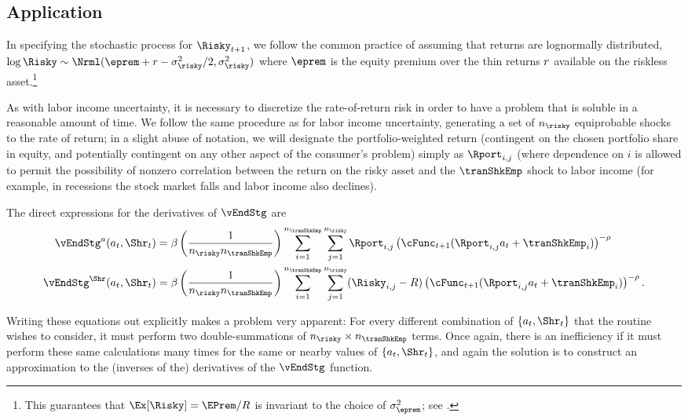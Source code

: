 \subsection{Application}\label{subsec:MCApplication}


In specifying the stochastic process for $\Risky_{\prd+1}$, we follow the common practice of assuming that returns are lognormally distributed, $\log \Risky \sim \Nrml(\eprem+\rfree-\sigma^{2}_{\risky}/2,\sigma^{2}_{\risky})$ where $\eprem$ is the equity premium over the thin returns $r$ available on the riskless asset.\footnote{This guarantees that $\Ex[\Risky] = \EPrem/\Rfree$ is invariant to the choice of $\sigma^{2}_{\eprem}$; see .}

As with labor income uncertainty, it is necessary to discretize the rate-of-return risk in order to have a problem that is soluble in a reasonable amount of time.  We follow the same procedure as for labor income uncertainty, generating a set of $n_{\risky}$ equiprobable shocks to the rate of return; in a slight abuse of notation, we will designate the portfolio-weighted return (contingent on the chosen portfolio share in equity, and potentially contingent on any other aspect of the consumer's problem) simply as $\Rport_{i,j}$ (where dependence on $i$ is allowed to permit the possibility of nonzero correlation between the return on the risky asset and the $\tranShkEmp$ shock to labor income (for example, in recessions the stock market falls and labor income also declines).

The direct expressions for the derivatives of $\vEndStg$ are
\begin{equation}\begin{gathered}\begin{aligned}
      \vEndStg^{a}(a_{\prd},\Shr_{\prd})  & = \DiscFac \left(\frac{1}{n_{\risky} n_{\tranShkEmp}}\right)\sum_{i=1}^{n_{\tranShkEmp}}\sum_{j=1}^{n_{\risky} }\Rport_{i,j} \left(\cFunc_{\prd+1}(\Rport_{i,j}a_{\prd}+\tranShkEmp_{i})\right)^{-\CRRA}
      \\      \vEndStg^{\Shr}(a_{\prd},\Shr_{\prd})  & = \DiscFac \left(\frac{1}{n_{\risky} n_{\tranShkEmp}}\right)\sum_{i=1}^{n_{\tranShkEmp}}\sum_{j=1}^{n_{\risky} }(\Risky_{i,j}-\Rfree)\left(\cFunc_{\prd+1}(\Rport_{i,j}a_{\prd}+\tranShkEmp_{i})\right)^{-\CRRA}.
    \end{aligned}\end{gathered}\end{equation}

Writing these equations out explicitly makes a problem very apparent: For every different combination of $\{{a}_{\prd},\Shr_{\prd}\}$ that the routine wishes to consider, it must perform two double-summations of $n_{\risky} \times n_{\tranShkEmp}$ terms.  Once again, there is an inefficiency if it must perform these same calculations many times for the same or nearby values of $\{{a}_{\prd},\Shr_{\prd}\}$, and again the solution is to construct an approximation to the (inverses of the) derivatives of the $\vEndStg$ function.

